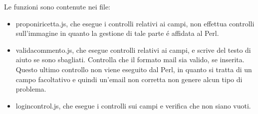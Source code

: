 \documentclass[12pt]{article}
\begin{document}
\begin{itemize}
				Le funzioni sono contenute nei file:
				\begin{itemize}
					\item proponiricetta.js, che esegue i controlli relativi ai campi, non effettua controlli sull'immagine in quanto la gestione di tale parte \'e affidata al Perl.
				\end{itemize}
				\begin{itemize}
					\item validacommento.js, che esegue controlli relativi ai campi, e scrive del testo di aiuto se sono sbagliati. Controlla che il formato mail sia valido, se inserita. Questo ultimo controllo non viene eseguito dal Perl, in quanto si tratta di un campo facoltativo e quindi un'email non corretta non genere alcun tipo di problema. 
				\end{itemize}
				\begin{itemize}
					\item logincontrol.js, che esegue i controlli sui campi e verifica che non siano vuoti.
				\end{itemize}	
			\end{itemize}
			
			
			
			
				
		
	
	
\end{document}
